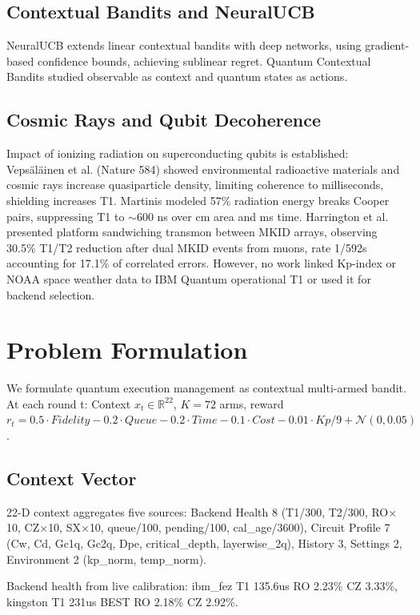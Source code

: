 \documentclass[conference]{IEEEtran}
\begin{document}
\subsection{Contextual Bandits and NeuralUCB}
NeuralUCB \cite{zhou2020neural} extends linear contextual bandits with deep networks, using gradient-based confidence bounds, achieving sublinear regret. Quantum Contextual Bandits \cite{brahmachari2023quantum} studied observable as context and quantum states as actions.

\subsection{Cosmic Rays and Qubit Decoherence}
Impact of ionizing radiation on superconducting qubits is established: Veps\"al\"ainen et al. \cite{vepsalainen2020impact} (Nature 584) showed environmental radioactive materials and cosmic rays increase quasiparticle density, limiting coherence to milliseconds, shielding increases T1. Martinis \cite{martinis2021saving} modeled 57\% radiation energy breaks Cooper pairs, suppressing T1 to $\sim$600 ns over cm area and ms time. Harrington et al. \cite{harrington2025synchronous} presented platform sandwiching transmon between MKID arrays, observing 30.5\% T1/T2 reduction after dual MKID events from muons, rate 1/592s accounting for 17.1\% of correlated errors. However, no work linked Kp-index or NOAA space weather data to IBM Quantum operational T1 or used it for backend selection.

\section{Problem Formulation}
We formulate quantum execution management as contextual multi-armed bandit. At each round t: Context $x_t \in \mathbb{R}^{22}$, $K=72$ arms, reward $r_t = 0.5\cdot Fidelity -0.2\cdot Queue -0.2\cdot Time -0.1\cdot Cost -0.01\cdot Kp/9 + \mathcal{N}(0,0.05)$.

\subsection{Context Vector}
22-D context aggregates five sources: Backend Health 8 (T1/300, T2/300, RO$\times$10, CZ$\times$10, SX$\times$10, queue/100, pending/100, cal\_age/3600), Circuit Profile 7 (Cw, Cd, Gc1q, Gc2q, Dpe, critical\_depth, layerwise\_2q), History 3, Settings 2, Environment 2 (kp\_norm, temp\_norm).

Backend health from live calibration: ibm\_fez T1 135.6us RO 2.23\% CZ 3.33\%, kingston T1 231us BEST RO 2.18\% CZ 2.92\%.
\end{document}
